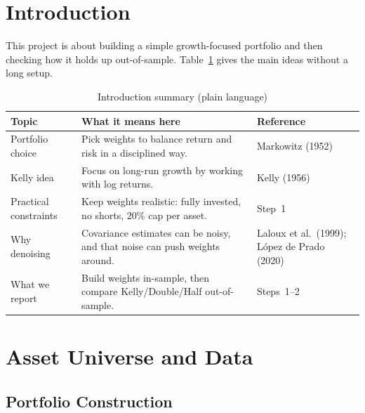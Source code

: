 \documentclass[11pt,a4paper]{article}
\begin{document}
\section{Introduction}

This project is about building a simple growth-focused portfolio and then checking how it holds up out-of-sample. Table~\ref{tab:intro_summary} gives the main ideas without a long setup.

\begin{table}[H]
\centering
\caption{Introduction summary (plain language)}
\label{tab:intro_summary}
{\small\setlength{\tabcolsep}{4pt}\renewcommand{\arraystretch}{1.15}\begin{tabularx}{\textwidth}{>{\raggedright\arraybackslash}p{3.8cm} X >{\raggedright\arraybackslash}p{3.2cm}}
\toprule
Topic & What it means here & Reference \\
\midrule
Portfolio choice & Pick weights to balance return and risk in a disciplined way. & Markowitz (1952) \\
Kelly idea & Focus on long-run growth by working with log returns. & Kelly (1956) \\
Practical constraints & Keep weights realistic: fully invested, no shorts, 20\% cap per asset. & Step~1 \\
Why denoising & Covariance estimates can be noisy, and that noise can push weights around. & Laloux et al.\ (1999); L\'{o}pez de Prado (2020) \\
What we report & Build weights in-sample, then compare Kelly/Double/Half out-of-sample. & Steps~1--2 \\
\bottomrule
\end{tabularx}}
\end{table}

\section{Asset Universe and Data}

\subsection{Portfolio Construction}
\end{document}

